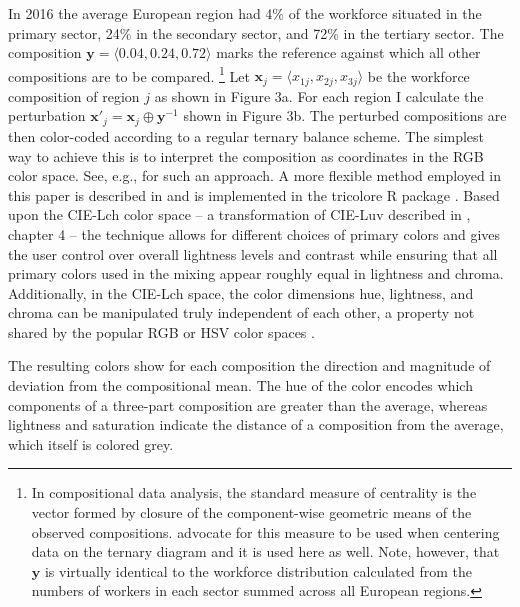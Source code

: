 \documentclass[10pt,twoside,reqno]{article}
\let\oldfootnote\footnote
\renewcommand\footnote[1]{%
\oldfootnote{\hspace{0.6mm}#1}}
\begin{document}
In 2016 the average European region had 4\% of the workforce situated in
the primary sector, 24\% in the secondary sector, and 72\% in the
tertiary sector. The composition
\(\mathbf{y}=\langle 0.04, 0.24, 0.72 \rangle\) marks the reference
against which all other compositions are to be compared.\footnote{ In
  compositional data analysis, the standard measure of centrality is the
  vector formed by closure of the component-wise geometric means of the
  observed compositions. \citet{VonEynatten2002} advocate for this
  measure to be used when centering data on the ternary diagram and it
  is used here as well. Note, however, that \(\mathbf{y}\) is virtually
  identical to the workforce distribution calculated from the numbers of
  workers in each sector summed across all European regions.} Let
\(\mathbf{x}_j = \langle x_{1j}, x_{2j}, x_{3j} \rangle\) be the
workforce composition of region \(j\) as shown in Figure 3a. For each
region I calculate the perturbation
\(\mathbf{x}'_j = \mathbf{x}_j \oplus \mathbf{y}^{-1}\) shown in Figure
3b. The perturbed compositions are then color-coded according to a
regular ternary balance scheme. The simplest way to achieve this is to
interpret the composition as coordinates in the RGB color space. See,
e.g., \citet{Wang2009} for such an approach. A more flexible method
employed in this paper is described in \citet{Schoeley2017} and is
implemented in the tricolore R package \citep{Schoeley2019a}. Based upon
the CIE-Lch color space -- a transformation of CIE-Luv described in
\citet{Ware2013}, chapter 4 -- the technique allows for different
choices of primary colors and gives the user control over overall
lightness levels and contrast while ensuring that all primary colors
used in the mixing appear roughly equal in lightness and chroma.
Additionally, in the CIE-Lch space, the color dimensions hue, lightness,
and chroma can be manipulated truly independent of each other, a
property not shared by the popular RGB or HSV color spaces
\citep{Zeileis2009}.

The resulting colors show for each composition the direction and
magnitude of deviation from the compositional mean. The hue of the color
encodes which components of a three-part composition are greater than
the average, whereas lightness and saturation indicate the distance of a
composition from the average, which itself is colored grey.
\end{document}
